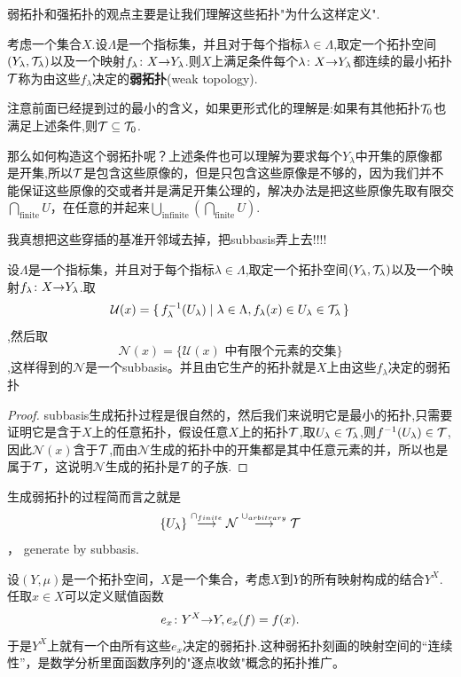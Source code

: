 弱拓扑和强拓扑的观点主要是让我们理解这些拓扑"为什么这样定义".


\begin{definition}
考虑一个集合$X$.设$\Lambda$是一个指标集，并且对于每个指标$\lambda \in \Lambda$,取定一个拓扑空间$(Y_\lambda,\mathcal{T}_\lambda)$以及一个映射${f_\lambda}\colon{X}{\to}{Y_\lambda}$.则$X$上满足条件每个${\lambda}\colon{X}{\to}{Y_\lambda}$都连续的最小拓扑$\mathcal{T}$称为由这些$f_\lambda$决定的\textbf{弱拓扑}(weak topology).
\end{definition}

注意前面已经提到过的最小的含义，如果更形式化的理解是:如果有其他拓扑$\mathcal{T}_0$也满足上述条件,则$\mathcal{T} \subseteq \mathcal{T}_0$.

那么如何构造这个弱拓扑呢？上述条件也可以理解为要求每个$Y_\lambda$中开集的原像都是开集,所以$\mathcal{T}$是包含这些原像的，但是只包含这些原像是不够的，因为我们并不能保证这些原像的交或者并是满足开集公理的，解决办法是把这些原像先取有限交$\bigcap\limits_{\text{finite}} U$，在任意的并起来$\bigcup\limits_{\text{infinite}} \left( \bigcap\limits_{\text{finite}} U \right)$.

我真想把这些穿插的基准开邻域去掉，把subbasis弄上去!!!!

\begin{proposition}
设$\Lambda$是一个指标集，并且对于每个指标$\lambda \in \Lambda$,取定一个拓扑空间$(Y_\lambda,\mathcal{T}_\lambda)$以及一个映射${f_\lambda}\colon{X}{\to}{Y_\lambda}$.取 \[\mathcal{U}(x)=\{\,f_{\lambda}^{-1}(U_\lambda)\mid\lambda \in \Lambda,f_\lambda(x) \in U_\lambda \in \mathcal{T}_\lambda\,\}\],然后取\[\mathcal{N}(x)=\{\mathcal{U}(x)\text{ 中有限个元素的交集}\}\],这样得到的$\mathcal{N}$是一个subbasis。并且由它生产的拓扑就是$X$上由这些$f_\lambda$决定的弱拓扑
\end{proposition}

\begin{proof}
subbasis生成拓扑过程是很自然的，然后我们来说明它是最小的拓扑,只需要证明它是含于$X$上的任意拓扑，假设任意$X$上的拓扑$\mathcal{T}$,取$U_\lambda \in \mathcal{T}_\lambda$,则$f^{-1}(U_\lambda) \in \mathcal{T}$,因此$\mathcal{N}(x)$含于$\mathcal{T}$,而由$\mathcal{N}$生成的拓扑中的开集都是其中任意元素的并，所以也是属于$\mathcal{T}$，这说明$\mathcal{N}$生成的拓扑是$\mathcal{T}$的子族.
\end{proof}

生成弱拓扑的过程简而言之就是\[\{U_\lambda\}\stackrel{\cap_{finite}}\longrightarrow \mathcal{N}\stackrel{\cup_{arbitrary}}\longrightarrow \mathcal{T}\]， generate by subbasis.


\begin{example}
设$(Y,\mu)$是一个拓扑空间，$X$是一个集合，考虑$X$到$Y$的所有映射构成的结合$Y^X$.任取$x \in X$可以定义赋值函数\[{e_x}\colon{Y^{X}}{\to}{Y}, e_x(f)=f(x).\]于是$Y^{X}$上就有一个由所有这些$e_x$决定的弱拓扑.这种弱拓扑刻画的映射空间的“连续性”，是数学分析里面函数序列的"逐点收敛"概念的拓扑推广。
\end{example}

